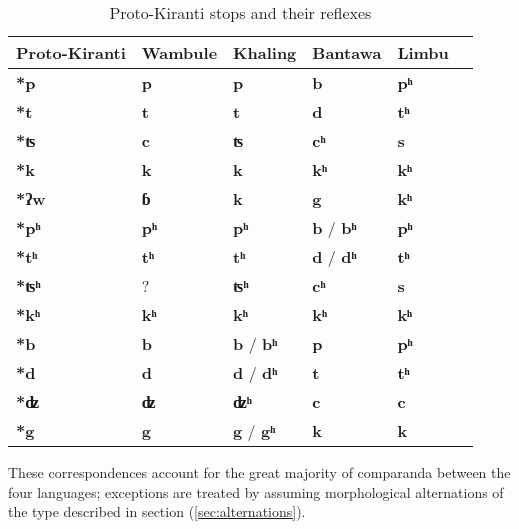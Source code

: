 \documentclass[oneside,a4paper,11pt]{article}
\newcommand{\ipa}[1]{\textbf{{\phon\mbox{#1}}}} %
\begin{document}
\begin{table}[h]
\caption{Proto-Kiranti stops and their reflexes} \centering \label{tab:stops}
\begin{tabular}{llllll}
\toprule
Proto-Kiranti & Wambule & Khaling & Bantawa & Limbu \\
\midrule
\ipa{*p} & \ipa{p} & \ipa{p} & \ipa{b} & \ipa{pʰ}  \\
\ipa{*t} & \ipa{t} & \ipa{t} & \ipa{d} & \ipa{tʰ}  \\
\ipa{*ʦ} & \ipa{c} & \ipa{ʦ} & \ipa{cʰ} & \ipa{s}  \\
\ipa{*k} & \ipa{k} & \ipa{k} & \ipa{kʰ} & \ipa{kʰ}  \\
\midrule
\ipa{*ʔw} & \ipa{ɓ} & \ipa{k} & \ipa{g} & \ipa{kʰ}  \\
\midrule
\ipa{*pʰ} & \ipa{pʰ} & \ipa{pʰ} & \ipa{b} / \ipa{bʰ}  & \ipa{pʰ}  \\
\ipa{*tʰ} & \ipa{tʰ} & \ipa{tʰ} & \ipa{d} / \ipa{dʰ} & \ipa{tʰ}  \\
\ipa{*ʦʰ} & ? & \ipa{ʦʰ} & \ipa{cʰ}  & \ipa{s}  \\
\ipa{*kʰ} & \ipa{kʰ} & \ipa{kʰ} & \ipa{kʰ} & \ipa{kʰ}  \\
\midrule
\ipa{*b} & \ipa{b} &\ipa{b} / \ipa{bʰ}  & \ipa{p} & \ipa{pʰ}  \\
\ipa{*d} & \ipa{d} & \ipa{d} / \ipa{dʰ}  & \ipa{t} & \ipa{tʰ}  \\
\ipa{*ʣ} & \ipa{ʣ} & \ipa{ʣʰ} & \ipa{c} & \ipa{c}  \\
\ipa{*g} & \ipa{g} & \ipa{g} / \ipa{gʰ}  & \ipa{k} & \ipa{k}  \\
\bottomrule
\end{tabular}
\end{table}
These correspondences account for the great majority of comparanda between the four languages; exceptions are treated by assuming  morphological alternations of the type described in section (\ref{sec:alternations}).
\end{document}
